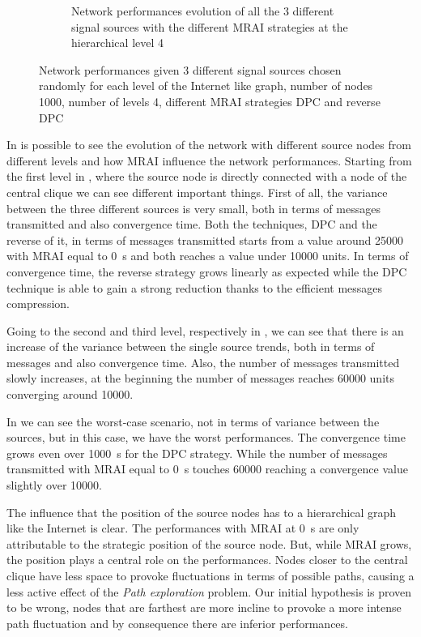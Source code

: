 \begin{figure}[h]
\begin{subfigure}[b]{0.49\textwidth}
		 \caption{Network performances evolution of all the \num{3} different signal sources
			with the different \ac{MRAI} strategies at the hierarchical level \num{4}}
         \label{fig:different_levels_4}
     \end{subfigure}
     \hfill
	 \caption{Network performances given \num{3} different signal sources chosen
		randomly for each level of the Internet like graph, number of nodes
		\num{1000}, number of levels \num{4}, different \ac{MRAI} strategies
		\ac{DPC} and reverse \ac{DPC} }
	 \label{fig:different_levels}
\end{figure}

In  is possible to see the evolution of the network
with different source nodes from different levels and how \ac{MRAI} influence
the network performances.
Starting from the first level in , where the source
node is directly connected with a node of the central clique we can see different
important things.
First of all, the variance between the three different sources is very small,
both in terms of messages transmitted and also convergence time.
Both the techniques, \ac{DPC} and the reverse of it, in terms of messages
transmitted starts from a value around \num{25000} with \ac{MRAI} equal to
\SI{0}{\second} and both reaches a value under \num{10000} units.
In terms of convergence time, the reverse strategy grows linearly as expected
while the \ac{DPC} technique is able to gain a strong reduction thanks to
the efficient messages compression.

Going to the second and third level, respectively in
, we can see that there
is an increase of the variance between the single source trends, both in terms
of messages and also convergence time.
Also, the number of messages transmitted slowly increases, at the beginning the
number of messages reaches \num{60000} units converging around \num{10000}.

In  we can see the worst-case scenario, not in
terms of variance between the sources, but in this case, we have the worst
performances.
The convergence time grows even over \SI{1000}{\second} for the \ac{DPC} strategy.
While the number of messages transmitted with \ac{MRAI} equal to \SI{0}{\second}
touches \num{60000} reaching a convergence value slightly over \num{10000}.

The influence that the position of the source nodes has to
a hierarchical graph like the Internet is clear.
The performances with \ac{MRAI} at \SI{0}{\second} are only attributable to the
strategic position of the source node.
But, while \ac{MRAI} grows, the position plays a central role on the performances.
Nodes closer to the central clique have less space to provoke fluctuations
in terms of possible paths, causing a less active effect of the \textit{Path exploration}
problem.
Our initial hypothesis is proven to be wrong, nodes that are farthest are more incline
to provoke a more intense path fluctuation and by consequence there are inferior
performances.


